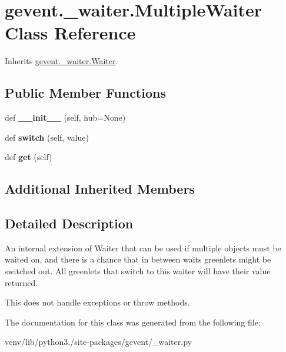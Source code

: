 \hypertarget{classgevent_1_1__waiter_1_1_multiple_waiter}{}\section{gevent.\+\_\+waiter.\+Multiple\+Waiter Class Reference}
\label{classgevent_1_1__waiter_1_1_multiple_waiter}


Inherits \hyperlink{classgevent_1_1__waiter_1_1_waiter}{gevent.\+\_\+waiter.\+Waiter}.

\subsection*{Public Member Functions}
\begin{DoxyCompactItemize}
\item 
\mbox{\label{classgevent_1_1__waiter_1_1_multiple_waiter_a8284252056079bf7eecb8d4fd547d95b}} 
def {\bfseries \+\_\+\+\_\+init\+\_\+\+\_\+} (self, hub=None)
\item 
\mbox{\label{classgevent_1_1__waiter_1_1_multiple_waiter_a649b1a50d4602c6ce0baf1dea846cf8d}} 
def {\bfseries switch} (self, value)
\item 
\mbox{\label{classgevent_1_1__waiter_1_1_multiple_waiter_a5513b566171731aa7b537954dac92fb8}} 
def {\bfseries get} (self)
\end{DoxyCompactItemize}
\subsection*{Additional Inherited Members}


\subsection{Detailed Description}
\begin{DoxyVerb}An internal extension of Waiter that can be used if multiple objects
must be waited on, and there is a chance that in between waits greenlets
might be switched out. All greenlets that switch to this waiter
will have their value returned.

This does not handle exceptions or throw methods.
\end{DoxyVerb}
 

The documentation for this class was generated from the following file\+:\begin{DoxyCompactItemize}
\item 
venv/lib/python3./site-\/packages/gevent/\+\_\+waiter.\+py\end{DoxyCompactItemize}
